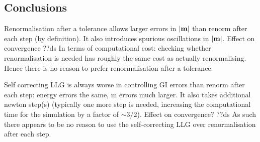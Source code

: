 \subsection{Conclusions}

Renormalisation after a tolerance allows larger errors in $\left|{\boldsymbol{\mathrm{m}}} \right|$ than renorm after each step (by definition).
It also introduces spurious oscillations in $\left|{\boldsymbol{\mathrm{m}}} \right|$.
Effect on convergence ??ds
In terms of computational cost: checking whether renormalisation is needed has roughly the same cost as actually renormalising.
Hence there is no reason to prefer renormalisation after a tolerance.


Self correcting LLG is always worse in controlling GI errors than renorm after each step: energy errors the same, m errors much larger.
It also takes additional newton step(s) (typically one more step is needed, increasing the computational time for the simulation by a factor of $\sim 3/2$).
Effect on convergence? ??ds
As such there appears to be no reason to use the self-correcting LLG over renormalisation after each step.

